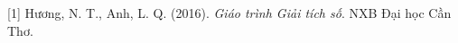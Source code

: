 [1] Hương, N. T., Anh, L. Q. (2016). \textit{Giáo trình Giải tích số}. NXB Đại học Cần Thơ.\par
[2] 
